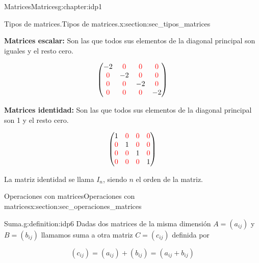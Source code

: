 \documentclass[oneside,12pt,]{book}
\newcommand{\terminology}[1]{\textbf{#1}}
\newcommand{\amp}{&}
\begin{document}
\begin{chapterptx}{Matrices}{}{Matrices}{}{}{g:chapter:idp1}
\begin{sectionptx}{Tipos de matrices.}{}{Tipos de matrices.}{}{}{x:section:sec_tipos_matrices}
\begin{equation*}
\end{equation*}
%
\par
\terminology{Matrices escalar:} Son las que todos sus elementos  de la diagonal principal son iguales y el resto cero.%
\par
%
\begin{equation*}
\begin{pmatrix} -2 \amp \color{red}0 \amp \color{red}0 \amp \color{red}0  \\
\color{red}0 \amp -2  \amp \color{red}0 \amp \color{red}0  \\
\color{red}0 \amp \color{red}0 \amp -2 \amp \color{red}0 \\
\color{red}0 \amp \color{red}0  \amp \color{red}0 \amp -2  \\ 
\end{pmatrix}
\end{equation*}
%
\par
\terminology{Matrices identidad:} Son las que todos sus elementos  de la diagonal principal son 1 y el resto cero.%
\par
%
\begin{equation*}
\begin{pmatrix} 1 \amp \color{red}0 \amp \color{red}0 \amp \color{red}0  \\
\color{red}0 \amp 1  \amp \color{red}0 \amp \color{red}0  \\
\color{red}0 \amp \color{red}0 \amp 1 \amp \color{red}0 \\
\color{red}0 \amp \color{red}0  \amp \color{red}0 \amp 1  \\ 
\end{pmatrix}
\end{equation*}
%
\par
La matriz identidad se llama \(I_n\), siendo \(n\) el orden de la matriz.%
\end{sectionptx}
%
%
\typeout{************************************************}
\typeout{************************************************}
%
\begin{sectionptx}{Operaciones con matrices}{}{Operaciones con matrices}{}{}{x:section:sec_operaciones_matrices}
\begin{definition}{Suma.}{g:definition:idp6}%
Dadas dos matrices de la misma dimensión \(A=(a_{ij})\) y \(B=(b_{ij})\) llamamos suma a otra matriz \(C=(c_{ij})\) definida por%
\par
%
\begin{equation*}
(c_{ij})=(a_{ij})+(b_{ij})=(a_{ij}+b_{ij})

\end{equation*}
\end{definition}
\end{sectionptx}
\end{chapterptx}
\end{document}
